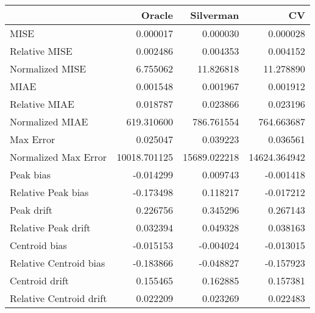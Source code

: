 \begin{tabular}{lrrr}
  \hline
 & Oracle & Silverman & CV \\ 
  \hline
MISE & 0.000017 & 0.000030 & 0.000028 \\ 
  Relative MISE & 0.002486 & 0.004353 & 0.004152 \\ 
  Normalized MISE & 6.755062 & 11.826818 & 11.278890 \\ 
  MIAE & 0.001548 & 0.001967 & 0.001912 \\ 
  Relative MIAE & 0.018787 & 0.023866 & 0.023196 \\ 
  Normalized MIAE & 619.310600 & 786.761554 & 764.663687 \\ 
  Max Error & 0.025047 & 0.039223 & 0.036561 \\ 
  Normalized Max Error & 10018.701125 & 15689.022218 & 14624.364942 \\ 
  Peak bias & -0.014299 & 0.009743 & -0.001418 \\ 
  Relative Peak bias & -0.173498 & 0.118217 & -0.017212 \\ 
  Peak drift & 0.226756 & 0.345296 & 0.267143 \\ 
  Relative Peak drift & 0.032394 & 0.049328 & 0.038163 \\ 
  Centroid bias & -0.015153 & -0.004024 & -0.013015 \\ 
  Relative Centroid bias & -0.183866 & -0.048827 & -0.157923 \\ 
  Centroid drift & 0.155465 & 0.162885 & 0.157381 \\ 
  Relative Centroid drift & 0.022209 & 0.023269 & 0.022483 \\ 
   \hline
\end{tabular}
